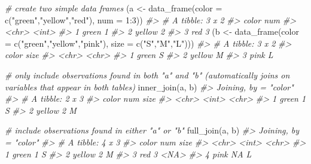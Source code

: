 \documentclass[
]{book}
\newenvironment{Shaded}{\begin{snugshade}}{\end{snugshade}}
\newcommand{\AttributeTok}[1]{\textcolor[rgb]{0.77,0.63,0.00}{#1}}
\newcommand{\CommentTok}[1]{\textcolor[rgb]{0.56,0.35,0.01}{\textit{#1}}}
\newcommand{\DecValTok}[1]{\textcolor[rgb]{0.00,0.00,0.81}{#1}}
\newcommand{\FunctionTok}[1]{\textcolor[rgb]{0.00,0.00,0.00}{#1}}
\newcommand{\NormalTok}[1]{#1}
\newcommand{\OtherTok}[1]{\textcolor[rgb]{0.56,0.35,0.01}{#1}}
\newcommand{\SpecialCharTok}[1]{\textcolor[rgb]{0.00,0.00,0.00}{#1}}
\newcommand{\StringTok}[1]{\textcolor[rgb]{0.31,0.60,0.02}{#1}}
\begin{document}
\begin{Shaded}
\begin{Highlighting}[]
\CommentTok{\# create two simple data frames}
\NormalTok{(a }\OtherTok{\textless{}{-}} \FunctionTok{data\_frame}\NormalTok{(}\AttributeTok{color =} \FunctionTok{c}\NormalTok{(}\StringTok{"green"}\NormalTok{,}\StringTok{"yellow"}\NormalTok{,}\StringTok{"red"}\NormalTok{), }\AttributeTok{num =} \DecValTok{1}\SpecialCharTok{:}\DecValTok{3}\NormalTok{))}
\CommentTok{\#\textgreater{} \# A tibble: 3 x 2}
\CommentTok{\#\textgreater{}   color    num}
\CommentTok{\#\textgreater{}   \textless{}chr\textgreater{}  \textless{}int\textgreater{}}
\CommentTok{\#\textgreater{} 1 green      1}
\CommentTok{\#\textgreater{} 2 yellow     2}
\CommentTok{\#\textgreater{} 3 red        3}
\NormalTok{(b }\OtherTok{\textless{}{-}} \FunctionTok{data\_frame}\NormalTok{(}\AttributeTok{color =} \FunctionTok{c}\NormalTok{(}\StringTok{"green"}\NormalTok{,}\StringTok{"yellow"}\NormalTok{,}\StringTok{"pink"}\NormalTok{), }\AttributeTok{size =} \FunctionTok{c}\NormalTok{(}\StringTok{"S"}\NormalTok{,}\StringTok{"M"}\NormalTok{,}\StringTok{"L"}\NormalTok{)))}
\CommentTok{\#\textgreater{} \# A tibble: 3 x 2}
\CommentTok{\#\textgreater{}   color  size }
\CommentTok{\#\textgreater{}   \textless{}chr\textgreater{}  \textless{}chr\textgreater{}}
\CommentTok{\#\textgreater{} 1 green  S    }
\CommentTok{\#\textgreater{} 2 yellow M    }
\CommentTok{\#\textgreater{} 3 pink   L}

\CommentTok{\# only include observations found in both "a" and "b" (automatically joins on variables that appear in both tables)}
\FunctionTok{inner\_join}\NormalTok{(a, b)}
\CommentTok{\#\textgreater{} Joining, by = "color"}
\CommentTok{\#\textgreater{} \# A tibble: 2 x 3}
\CommentTok{\#\textgreater{}   color    num size }
\CommentTok{\#\textgreater{}   \textless{}chr\textgreater{}  \textless{}int\textgreater{} \textless{}chr\textgreater{}}
\CommentTok{\#\textgreater{} 1 green      1 S    }
\CommentTok{\#\textgreater{} 2 yellow     2 M}

\CommentTok{\# include observations found in either "a" or "b"}
\FunctionTok{full\_join}\NormalTok{(a, b)}
\CommentTok{\#\textgreater{} Joining, by = "color"}
\CommentTok{\#\textgreater{} \# A tibble: 4 x 3}
\CommentTok{\#\textgreater{}   color    num size }
\CommentTok{\#\textgreater{}   \textless{}chr\textgreater{}  \textless{}int\textgreater{} \textless{}chr\textgreater{}}
\CommentTok{\#\textgreater{} 1 green      1 S    }
\CommentTok{\#\textgreater{} 2 yellow     2 M    }
\CommentTok{\#\textgreater{} 3 red        3 \textless{}NA\textgreater{} }
\CommentTok{\#\textgreater{} 4 pink      NA L}


\end{Highlighting}
\end{Shaded}
\end{document}
